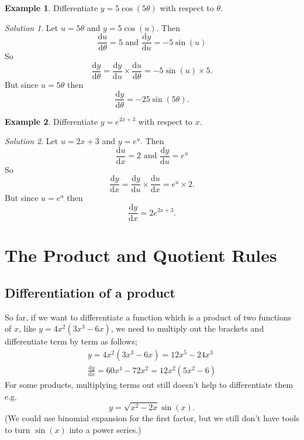 \documentclass[
  english,
  11pt,
  oneside]{book}
\newcommand{\slide}{}
\theoremstyle{definition}
\theoremstyle{definition}
\newtheorem{example}{Example}[chapter]
\theoremstyle{definition}
\theoremstyle{definition}
\theoremstyle{remark}
\newtheorem*{solution}{Solution}
\begin{document}
\slide

\begin{example}
Differentiate \(y=5\cos(5\theta)\) with respect to \(\theta\).
\end{example}

\begin{solution}
Let \(u = 5\theta\) and \(y = 5\cos(u)\). Then
\[
\frac{\mathrm{d} u}{{\mathrm{d} \theta}} = 5\text{ and }\frac{\mathrm{d} y}{\mathrm{d} u} = -5\sin(u)
\]
So
\[
\frac{\mathrm{d} y}{{\mathrm{d} \theta}} = \frac{\mathrm{d} y}{\mathrm{d} u}\times\frac{\mathrm{d} u}{{\mathrm{d} \theta}} = -5\sin(u)\times5.
\]
But since \(u = 5\theta\) then
\[
\frac{\mathrm{d} y}{{\mathrm{d} \theta}} = -25\sin(5\theta).
\]
\end{solution}

\slide

\begin{example}
Differentiate \(y=e^{2x+3}\) with respect to \(x\).
\end{example}

\begin{solution}
Let \(u = 2x+3\) and \(y = e^u\). Then
\[
\frac{\mathrm{d} u}{\mathrm{d} x} = 2\text{ and }\frac{\mathrm{d} y}{\mathrm{d} u} = e^u
\]
So
\[
\frac{\mathrm{d} y}{\mathrm{d} x} = \frac{\mathrm{d} y}{\mathrm{d} u}\times\frac{\mathrm{d} u}{\mathrm{d} x} = e^u\times2.
\]
But since \(u = e^u\) then
\[
\frac{\mathrm{d} y}{\mathrm{d} x} = 2e^{2x+3}.
\]
\end{solution}

\slide

\section{The Product and Quotient Rules}\label{lecture-six}

\subsection{Differentiation of a product}\label{differentiation-of-a-product}

So far, if we want to differentiate a function which is a product of two functions of \(x\), like \(y = 4x^2(3x^3 - 6x)\), we need to multiply out the brackets and differentiate term by term as follows;
\begin{gather*}
y = 4x^2(3x^3 - 6x) = 12x^5 - 24x^3\\
\frac{\mathrm{d} y}{\mathrm{d} x} = 60x^4 - 72x^2 = 12x^2(5x^2 - 6)
\end{gather*}
For some products, multiplying terms out still doesn't help to differentiate them e.g.
\[
y = \sqrt{x^2 - 2x} \sin(x).
\]
(We could use binomial expansion for the first factor, but we still don't have tools to turn \(\sin(x)\) into a power series.)
\slide
\end{document}
